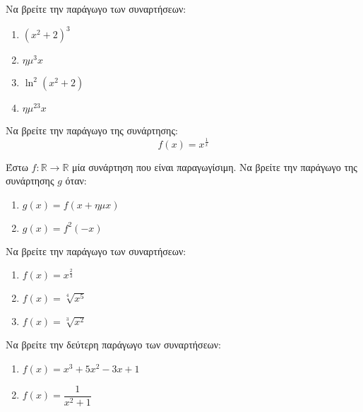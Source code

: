 \documentclass{presentation}
\begin{document}
\begin{askisi}
    Να βρείτε την παράγωγο των συναρτήσεων:
    \begin{enumerate}
        \item<1-> $(x^2+2)^3$
        \item<2-> $ημ^3x$
        \item<3-> $\ln^2(x^2+2)$
        \item<4-> $ημ^23x$
    \end{enumerate}

\end{askisi}

\begin{askisi}
    Να βρείτε την παράγωγο της συνάρτησης:
    $$f(x)=x^{\frac{1}{x}}$$

\end{askisi}

\begin{askisi}
    Έστω $f:\mathbb{R}\to\mathbb{R}$ μία συνάρτηση που είναι παραγωγίσιμη. Να βρείτε την παράγωγο της συνάρτησης $g$ όταν:
    \begin{enumerate}
        \item<1-> $g(x)=f(x+ημx)$
        \item<2-> $g(x)=f^2(-x)$
    \end{enumerate}

\end{askisi}

\begin{askisi}
    Να βρείτε την παράγωγο των συναρτήσεων:
    \begin{enumerate}
        \item<1-> $f(x)=x^{\frac{2}{3}}$
        \item<2-> $f(x)=\sqrt[4]{x^5}$
        \item<3-> $f(x)=\sqrt[3]{x^2}$
    \end{enumerate}

\end{askisi}

\begin{askisi}
    Να βρείτε την δεύτερη παράγωγο των συναρτήσεων:
    \begin{enumerate}
        \item<1-> $f(x)=x^3+5x^2-3x+1$
        \item<2-> $f(x)=\dfrac{1}{x^2+1}$
    \end{enumerate}

\end{askisi}
\end{document}

